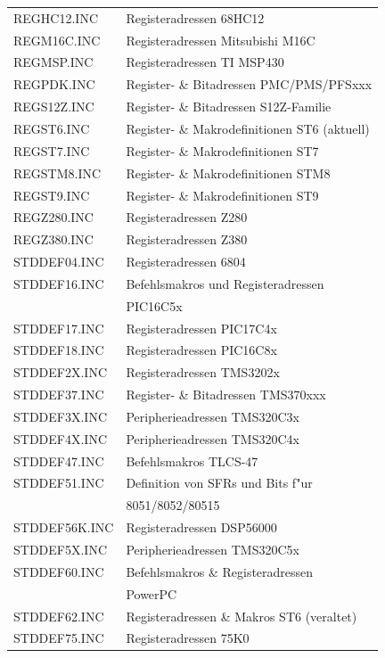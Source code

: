 \documentclass[12pt,a4paper,twoside]{report}
\begin{document}
\begin{center}
\begin{longtable}{|l|l|}
REGHC12.INC       & Registeradressen 68HC12 \\
REGM16C.INC       & Registeradressen Mitsubishi M16C \\
REGMSP.INC        & Registeradressen TI MSP430 \\
REGPDK.INC        & Register- \& Bitadressen PMC/PMS/PFSxxx \\
REGS12Z.INC       & Register- \& Bitadressen S12Z-Familie \\
REGST6.INC        & Register- \& Makrodefinitionen ST6 (aktuell)\\
REGST7.INC        & Register- \& Makrodefinitionen ST7 \\
REGSTM8.INC       & Register- \& Makrodefinitionen STM8 \\
REGST9.INC        & Register- \& Makrodefinitionen ST9 \\
REGZ280.INC       & Registeradressen Z280 \\
REGZ380.INC       & Registeradressen Z380 \\
STDDEF04.INC      & Registeradressen 6804 \\
STDDEF16.INC      & Befehlsmakros und Registeradressen \\
                  & PIC16C5x \\
STDDEF17.INC      & Registeradressen PIC17C4x \\
STDDEF18.INC      & Registeradressen PIC16C8x \\
STDDEF2X.INC      & Registeradressen TMS3202x \\
STDDEF37.INC      & Register- \& Bitadressen TMS370xxx \\
STDDEF3X.INC      & Peripherieadressen TMS320C3x \\
STDDEF4X.INC      & Peripherieadressen TMS320C4x \\
STDDEF47.INC      & Befehlsmakros TLCS-47 \\
STDDEF51.INC      & Definition von SFRs und Bits f"ur \\
                  & 8051/8052/80515 \\
STDDEF56K.INC     & Registeradressen DSP56000 \\
STDDEF5X.INC      & Peripherieadressen TMS320C5x \\
STDDEF60.INC      & Befehlsmakros \& Registeradressen \\
                  & PowerPC \\
STDDEF62.INC      & Registeradressen \& Makros ST6 (veraltet)\\
STDDEF75.INC      & Registeradressen 75K0 \\

\end{longtable}
\end{center}
\end{document}
